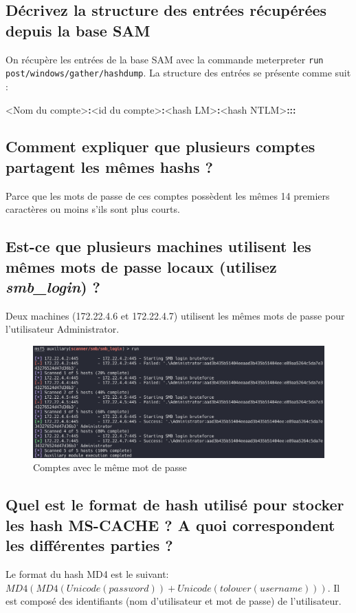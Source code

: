 \documentclass{extarticle} %
\begin{document}
    \subsection{Décrivez la structure des entrées récupérées depuis la base SAM}
    On récupère les entrées de la base SAM avec la commande meterpreter \texttt{run post/windows/gather/hashdump}.
    La structure des entrées se présente comme suit :

    <Nom du compte>\textbf{:}<id du compte>\textbf{:}<hash LM>\textbf{:}<hash NTLM>\textbf{:::}

    \subsection{Comment expliquer que plusieurs comptes partagent les mêmes hashs ?}
    Parce que les mots de passe de ces comptes possèdent les mêmes 14 premiers caractères ou moins s'ils sont plus courts.

    \subsection{Est-ce que plusieurs machines utilisent les mêmes mots de passe locaux (utilisez \textit{smb\_login}) ?}
    Deux machines (172.22.4.6 et 172.22.4.7) utilisent les mêmes mots de passe pour l'utilisateur Administrator.

    \begin{figure}[H]
        \centering
        \includegraphics[scale=0.3]{images/same_pwd.png}
        \caption{Comptes avec le même mot de passe}
    \end{figure}

    \subsection{Quel est le format de hash utilisé pour stocker les hash MS-CACHE ? A quoi correspondent les
    différentes parties ?}
    Le format du hash MD4 est le suivant: \texttt{$MD4( MD4(Unicode(password)) + Unicode(tolower(username)) )$}.
    Il est composé des identifiants (nom d'utilisateur et mot de passe) de l'utilisateur.
\end{document}
